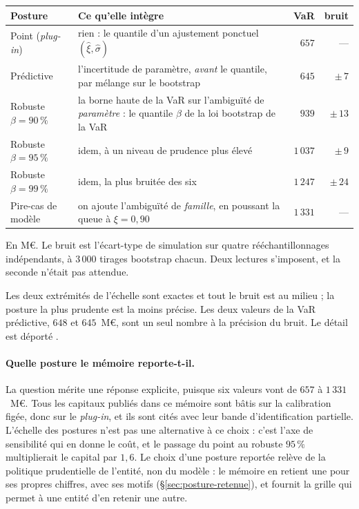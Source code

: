 \begin{center}\footnotesize
\renewcommand{\arraystretch}{1.25}
\begin{tabular}{@{}l p{6.6cm} r r@{}}
\toprule
\textbf{Posture} & \textbf{Ce qu'elle intègre} & \textbf{VaR} & \textbf{bruit} \\
\midrule
Point (\emph{plug-in}) & rien : le quantile d'un ajustement ponctuel $(\hat\xi,\hat\sigma)$ & $657$ & --- \\
Prédictive & l'incertitude de paramètre, \emph{avant} le quantile, par mélange sur le bootstrap & $645$ & $\pm\,7$ \\
Robuste $\beta=90\,\%$ & la borne haute de la VaR sur l'ambiguïté de \emph{paramètre} : le quantile $\beta$ de la loi bootstrap de la VaR & $939$ & $\pm\,13$ \\
Robuste $\beta=95\,\%$ & idem, à un niveau de prudence plus élevé & $1\,037$ & $\pm\,9$ \\
Robuste $\beta=99\,\%$ & idem, la plus bruitée des six & $1\,247$ & $\pm\,24$ \\
Pire-cas de modèle & on ajoute l'ambiguïté de \emph{famille}, en poussant la queue à $\xi=0{,}90$ & $1\,331$ & --- \\
\bottomrule
\end{tabular}
\end{center}

\vspace{4pt}
\noindent En M\euro. Le bruit est l'écart-type de simulation sur quatre rééchantillonnages
indépendants, à $3\,000$ tirages bootstrap chacun. Deux lectures s'imposent, et la seconde
n'était pas attendue.

Les deux extrémités de l'échelle sont exactes et tout le bruit est au milieu ; la posture la
plus prudente est la moins précise. Les deux valeurs de la VaR prédictive, $648$ et $645$~M\euro,
sont un seul nombre à la précision du bruit. Le détail est déporté \matcomp.

\paragraph{Quelle posture le mémoire reporte-t-il.} La question mérite une réponse explicite,
puisque six valeurs vont de $657$ à $1\,331$~M\euro. Tous les capitaux publiés dans ce mémoire
sont bâtis sur la calibration figée, donc sur le \emph{plug-in}, et ils sont cités avec
leur bande d'identification partielle. L'échelle des postures n'est pas une alternative à ce
choix : c'est l'axe de sensibilité qui en donne le coût, et le passage du point au robuste
$95\,\%$ multiplierait le capital par $1{,}6$. Le choix d'une posture reportée relève de la
politique prudentielle de l'entité, non du modèle : le mémoire en retient une pour ses propres
chiffres, avec ses motifs (\S\ref{sec:posture-retenue}), et fournit la grille qui permet à une
entité d'en retenir une autre.

